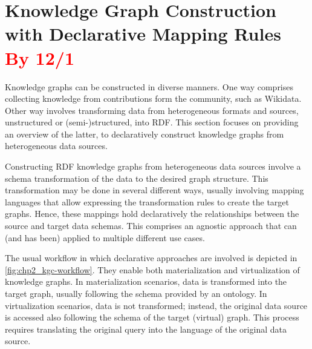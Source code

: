 \section{Knowledge Graph Construction with Declarative Mapping Rules \textcolor{red}{By 12/1}}
\label{sec:chp2_declarative_kgc}

Knowledge graphs can be constructed in diverse manners. One way comprises collecting knowledge from contributions form the community, such as Wikidata. Other way involves transforming data from heterogeneous formats and sources, unstructured or (semi-)structured, into RDF. This section focuses on providing an overview of the latter, to declaratively construct knowledge graphs from heterogeneous data sources.




Constructing RDF knowledge graphs from heterogeneous data sources involve a schema transformation of the data to the desired graph structure. This transformation may be done in several different ways, usually involving mapping languages that allow expressing the transformation rules to create the target graphs. Hence, these mappings hold declaratively the relationships between the source and target data schemas. This comprises an agnostic approach that can (and has been) applied to multiple different use cases. 

The usual workflow in which declarative approaches are involved is depicted in \cref{fig:chp2_kgc-workflow}. They enable both materialization and virtualization of knowledge graphs. In materialization scenarios, data is transformed into the target graph, usually following the schema provided by an ontology. In virtualization scenarios, data is not transformed; instead, the original data source is accessed also following the schema of the target (virtual) graph. This process requires translating the original query into the language of the original data source. 

